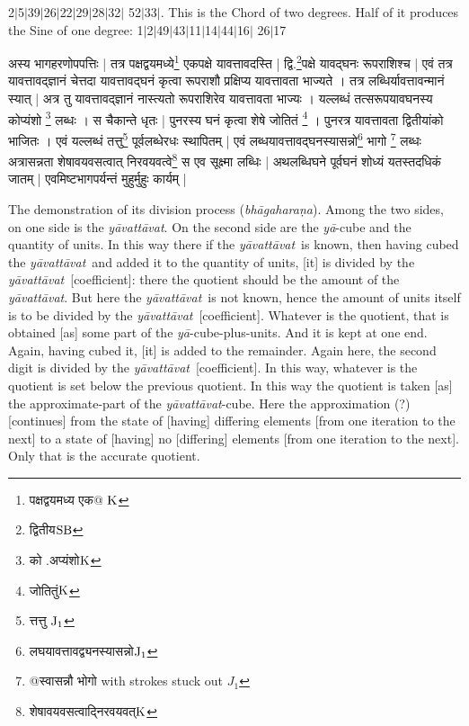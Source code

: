 \documentclass[11pt,a5paper]{book}
\def\yavattavat{\textit{y\=avatt\=avat}}
\def\ya{\textit{y\=a}}
\def\danda{$|$}
\begin{document}
{2\danda 5\danda 39\danda 26\danda 22\danda 29\danda 28\danda 32\danda
52\danda 33\danda . This is the Chord of two degrees. Half of it produces the
Sine of one degree: 
1\danda 2\danda 49\danda 43\danda 11\danda 14\danda 44\danda 16\danda
26\danda 17 

\newpage
{\s अस्य भागहरणोपपत्तिः | 
तत्र पक्षद्वयमध्ये\footnote{{\s पक्षद्वयमध्य एक@ }${\rm K}$} एकपक्षे
यावत्तावदस्ति | 
द्वि.\footnote{{\s द्वितीय}${\rm SB}$}पक्षे यावद्घनः रूपराशिश्च | 
एवं तत्र यावत्तावद्ज्ञानं चेत्तदा यावत्तावद्घनं कृत्वा
रूपराशौ प्रक्षिप्य यावत्तावता भाज्यते । तत्र लब्धिर्यावत्तावन्मानं
स्यात् | 
अत्र तु यावत्तावद्ज्ञानं
नास्त्यतो रूपराशिरेव यावत्तावता भाज्यः । 
यल्लब्धं तत्सरूपयावघनस्य कोप्यंशो \footnote{{\s को .अप्यंशो}${\rm K}$} लब्धः । 
स चैकान्ते धृतः | 
पुनरस्य घनं कृत्वा 
शेषे जोतितं \footnote{{\s जोतितुं}${\rm K}$} । पुनरत्र यावत्तावता द्वितीयांको भाजितः । 
एवं यल्लब्धं तत्तु\footnote{{\s त्तत्तु }${\rm J_1}$}
पूर्वलब्धेरधः स्थापितम् | 
एवं लब्धयावत्तावद्घनस्यासन्नो\footnote{{\s लघयावत्तावद्व्यनस्यासन्नो}${\rm J_1}$} भागो 
\footnote{{\s @स्वासन्नौ भोगो } with strokes stuck out $J_1$} %
लब्धः %
अत्रासन्नता शेषावयवसत्वात् निरवयवत्वे\footnote{{\s शेषावयवसत्वाद्निरवयवत्}${\rm K}$} स एव सूक्ष्मा
लब्धिः | 
अथलब्धिघने पूर्वघनं शोध्यं यतस्तदधिकं जातम् | 
एवमिष्टभागपर्यन्तं मुहुर्मुहुः कार्यम् | }
\newpage 

The demonstration of its division process ({\it bhāgaharaṇa}). Among the two sides, on one side is the \yavattavat. 
On the second side are the \ya-cube
and the quantity of units. In this way there if the \yavattavat\ is known, then having
cubed the \yavattavat\ and added it to the quantity of units, [it] is divided by 
the \yavattavat\ [coefficient]:  there the quotient should be the amount of the \yavattavat. But here the
\yavattavat\ is not known, hence the amount of units itself is to be divided by the \yavattavat\
[coefficient]. 
Whatever is the quotient, that is obtained [as] some part of the \ya-cube-plus-units.
And it is kept at one end. Again, having cubed it, [it] is added
to the remainder. Again here, the second digit is divided by the \yavattavat\ [coefficient]. In this way,
whatever is the quotient is set below the previous quotient. In this way
the quotient is taken [as] the approximate-part of the \yavattavat -cube. Here the 
approximation (?) [continues] from the state of [having] differing elements [from one iteration to the next] to a state of [having] no [differing] elements [from one iteration to the next]. Only that is the accurate quotient. 

}
\end{document}
